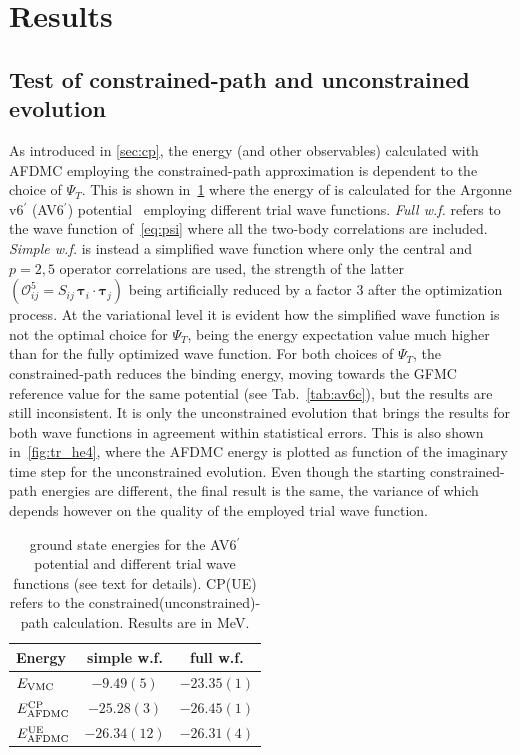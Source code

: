 \documentclass[aps,prc,twocolumn,superscriptaddress,floatfix]{revtex4-1}
\begin{document}
\section{Results}
\label{sec:res}


\subsection{Test of constrained-path and unconstrained evolution}
\label{sec:res_cp}
As introduced in \cref{sec:cp}, the energy (and other observables) calculated with AFDMC
employing the constrained-path approximation is dependent to the choice of $\Psi_T$.
This is shown in~\cref{tab:tr} where the energy of  
is calculated for the Argonne v6$^\prime$ (AV6$^\prime$) potential~\cite{Wiringa:2002} 
employing different trial wave functions. 
\textit{Full w.f.} refers to the wave function of~\cref{eq:psi} where all the two-body 
correlations are included.
\textit{Simple w.f.} is instead a simplified wave function where only the central and
$p=2,5$ operator correlations are used, the strength of the latter 
$(\mathcal O_{ij}^5=S_{ij}\,\bm\tau_i\cdot\bm\tau_j)$ being artificially reduced by 
a factor 3 after the optimization process. At the variational level it is evident how
the simplified wave function is not the optimal choice for $\Psi_T$, being the energy
expectation value much higher than for the fully optimized wave function. For both choices
of $\Psi_T$, the constrained-path reduces the binding energy, moving towards the
GFMC reference value for the same potential (see Tab.~\ref{tab:av6c}), but the results are still inconsistent.
It is only the unconstrained evolution that brings the results for both wave functions 
in agreement within statistical errors. This is also shown in~\cref{fig:tr_he4}, where the 
AFDMC energy is plotted as function of the imaginary time step for the unconstrained evolution. 
Even though the starting constrained-path energies are different, the final result is the same, the 
variance of which depends however on the quality of the employed trial wave function. 

\setlength{\tabcolsep}{8pt}
\begin{table}[htb]
\centering
\caption[]{ ground state energies for the AV6$^\prime$ potential and different 
trial wave functions (see text for details). 
CP(UE) refers to the constrained(unconstrained)-path calculation.
Results are in MeV.}
\begin{tabular}{lcc}
\hline\hline
Energy & simple w.f. & full w.f. \\
\hline
$E_{\rm VMC}$            & $-9.49(5)$   & $-23.35(1)$ \\
$E_{\rm AFDMC}^{\rm CP}$ & $-25.28(3)$  & $-26.45(1)$ \\
$E_{\rm AFDMC}^{\rm UE}$ & $-26.34(12)$ & $-26.31(4)$ \\
\hline\hline
\end{tabular}
\label{tab:tr}
\end{table}
\setlength{\tabcolsep}{8pt}
\end{document}
